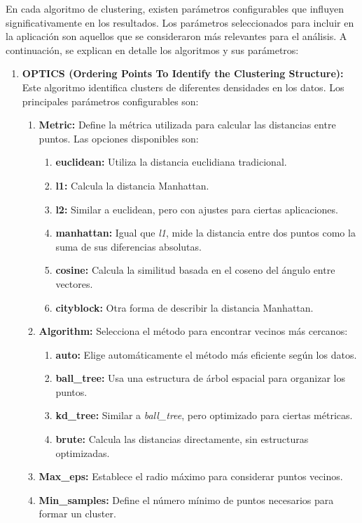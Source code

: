 En cada algoritmo de clustering, existen parámetros configurables que influyen significativamente en los resultados. Los parámetros seleccionados para incluir en la aplicación son aquellos que se consideraron más relevantes para el análisis. A continuación, se explican en detalle los algoritmos y sus parámetros:

\begin{enumerate}
    \item \textbf{OPTICS (Ordering Points To Identify the Clustering Structure):}
    Este algoritmo identifica clusters de diferentes densidades en los datos. Los principales parámetros configurables son:
    \begin{enumerate}
        \item \textbf{Metric:} Define la métrica utilizada para calcular las distancias entre puntos. Las opciones disponibles son:
        \begin{enumerate}
            \item \textbf{euclidean:} Utiliza la distancia euclidiana tradicional.
            \item \textbf{l1:} Calcula la distancia Manhattan.
            \item \textbf{l2:} Similar a euclidean, pero con ajustes para ciertas aplicaciones.
            \item \textbf{manhattan:} Igual que \textit{l1}, mide la distancia entre dos puntos como la suma de sus diferencias absolutas.
            \item \textbf{cosine:} Calcula la similitud basada en el coseno del ángulo entre vectores.
            \item \textbf{cityblock:} Otra forma de describir la distancia Manhattan.
        \end{enumerate}
        \item \textbf{Algorithm:} Selecciona el método para encontrar vecinos más cercanos:
        \begin{enumerate}
            \item \textbf{auto:} Elige automáticamente el método más eficiente según los datos.
            \item \textbf{ball\_tree:} Usa una estructura de árbol espacial para organizar los puntos.
            \item \textbf{kd\_tree:} Similar a \textit{ball\_tree}, pero optimizado para ciertas métricas.
            \item \textbf{brute:} Calcula las distancias directamente, sin estructuras optimizadas.
        \end{enumerate}
        \item \textbf{Max\_eps:} Establece el radio máximo para considerar puntos vecinos.
        \item \textbf{Min\_samples:} Define el número mínimo de puntos necesarios para formar un cluster.
    \end{enumerate}
    

\end{enumerate}
